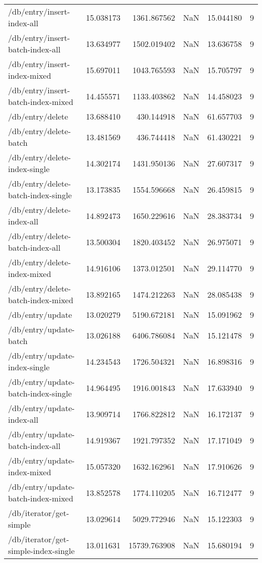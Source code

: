 \begin{longtable}{lrrrrr}
/db/entry/insert-index-all & 15.038173 & 1361.867562 & NaN & 15.044180 & 9 \\
/db/entry/insert-batch-index-all & 13.634977 & 1502.019402 & NaN & 13.636758 & 9 \\
/db/entry/insert-index-mixed & 15.697011 & 1043.765593 & NaN & 15.705797 & 9 \\
/db/entry/insert-batch-index-mixed & 14.455571 & 1133.403862 & NaN & 14.458023 & 9 \\
/db/entry/delete & 13.688410 & 430.144918 & NaN & 61.657703 & 9 \\
/db/entry/delete-batch & 13.481569 & 436.744418 & NaN & 61.430221 & 9 \\
/db/entry/delete-index-single & 14.302174 & 1431.950136 & NaN & 27.607317 & 9 \\
/db/entry/delete-batch-index-single & 13.173835 & 1554.596668 & NaN & 26.459815 & 9 \\
/db/entry/delete-index-all & 14.892473 & 1650.229616 & NaN & 28.383734 & 9 \\
/db/entry/delete-batch-index-all & 13.500304 & 1820.403452 & NaN & 26.975071 & 9 \\
/db/entry/delete-index-mixed & 14.916106 & 1373.012501 & NaN & 29.114770 & 9 \\
/db/entry/delete-batch-index-mixed & 13.892165 & 1474.212263 & NaN & 28.085438 & 9 \\
/db/entry/update & 13.020279 & 5190.672181 & NaN & 15.091962 & 9 \\
/db/entry/update-batch & 13.026188 & 6406.786084 & NaN & 15.121478 & 9 \\
/db/entry/update-index-single & 14.234543 & 1726.504321 & NaN & 16.898316 & 9 \\
/db/entry/update-batch-index-single & 14.964495 & 1916.001843 & NaN & 17.633940 & 9 \\
/db/entry/update-index-all & 13.909714 & 1766.822812 & NaN & 16.172137 & 9 \\
/db/entry/update-batch-index-all & 14.919367 & 1921.797352 & NaN & 17.171049 & 9 \\
/db/entry/update-index-mixed & 15.057320 & 1632.162961 & NaN & 17.910626 & 9 \\
/db/entry/update-batch-index-mixed & 13.852578 & 1774.110205 & NaN & 16.712477 & 9 \\
/db/iterator/get-simple & 13.029614 & 5029.772946 & NaN & 15.122303 & 9 \\
/db/iterator/get-simple-index-single & 13.011631 & 15739.763908 & NaN & 15.680194 & 9 \\

\end{longtable}
